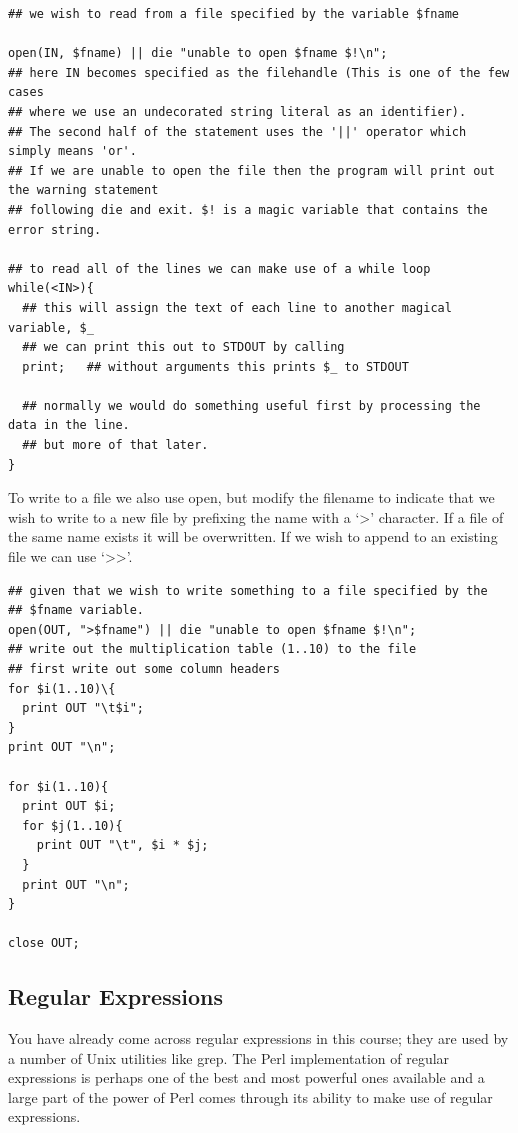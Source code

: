 \documentclass[11pt]{article}
\begin{document}
\begin{verbatim}
## we wish to read from a file specified by the variable $fname

open(IN, $fname) || die "unable to open $fname $!\n";
## here IN becomes specified as the filehandle (This is one of the few cases
## where we use an undecorated string literal as an identifier).
## The second half of the statement uses the '||' operator which simply means 'or'.
## If we are unable to open the file then the program will print out the warning statement
## following die and exit. $! is a magic variable that contains the error string.

## to read all of the lines we can make use of a while loop
while(<IN>){
  ## this will assign the text of each line to another magical variable, $_
  ## we can print this out to STDOUT by calling
  print;   ## without arguments this prints $_ to STDOUT

  ## normally we would do something useful first by processing the data in the line.
  ## but more of that later.
}
\end{verbatim}



To write to a file we also use open, but modify the filename to indicate
that we wish to write to a new file by prefixing the name with a `>'
character. If a file of the same name exists it will be overwritten. If
we wish to append to an existing file we can use `>>'.


\begin{verbatim}
## given that we wish to write something to a file specified by the
## $fname variable.
open(OUT, ">$fname") || die "unable to open $fname $!\n";
## write out the multiplication table (1..10) to the file
## first write out some column headers
for $i(1..10)\{
  print OUT "\t$i";
}
print OUT "\n";

for $i(1..10){
  print OUT $i;
  for $j(1..10){
    print OUT "\t", $i * $j;
  }
  print OUT "\n";
}

close OUT;
\end{verbatim}
\subsection{Regular Expressions}
\label{sec-5-6}


You have already come across regular expressions in this course; they
are used by a number of Unix utilities like grep. The Perl
implementation of regular expressions is perhaps one of the best and
most powerful ones available and a large part of the power of Perl comes
through its ability to make use of regular expressions.
\end{document}
